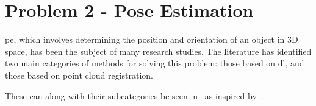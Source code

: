 






\section{Problem 2 - Pose Estimation}\label{sec:lit-rev-problem-2}

\gls{pe}, which involves determining the position and orientation of an object in 3D space, has been the subject of many research studies. The literature has identified two main categories of methods for solving this problem: those based on \gls{dl}, and those based on point cloud registration. \medskip

These can along with their subcategories be seen in~ as inspired by~\cite{a-comprehensive-survey-on-point-cloud-registration}.


